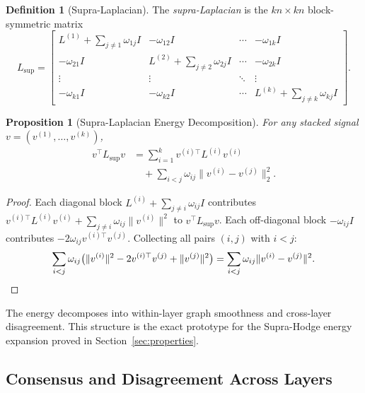 \documentclass[11pt]{article}
\newtheorem{proposition}[theorem]{Proposition}
\theoremstyle{definition}
\newtheorem{definition}[theorem]{Definition}
\theoremstyle{remark}
\newcommand{\Lsup}{L_{\mathrm{sup}}}
\begin{document}
\begin{definition}[Supra-Laplacian]
The \emph{supra-Laplacian} is the $kn\times kn$ block-symmetric matrix
\begin{equation}
  \label{eq:supra}
  \Lsup =
  \begin{bmatrix}
    L^{(1)} + \textstyle\sum_{j\neq 1}\omega_{1j}I & -\omega_{12}I & \cdots & -\omega_{1k}I\\
    -\omega_{21}I & L^{(2)} + \textstyle\sum_{j\neq 2}\omega_{2j}I & \cdots & -\omega_{2k}I\\
    \vdots & \vdots & \ddots & \vdots\\
    -\omega_{k1}I & -\omega_{k2}I & \cdots & L^{(k)} + \textstyle\sum_{j\neq k}\omega_{kj}I
  \end{bmatrix}.
\end{equation}
\end{definition}

\begin{proposition}[Supra-Laplacian Energy Decomposition]
\label{prop:supra_energy}
For any stacked signal $v=(v^{(1)},\allowbreak \dots,\allowbreak v^{(k)})$,
\begingroup
\small
\[
  \begin{aligned}
    v^\top \Lsup v
    &= \sum_{i=1}^k v^{(i)\top} L^{(i)} v^{(i)} \\
    &\quad + \sum_{i<j}\omega_{ij}\|v^{(i)} - v^{(j)}\|_2^2.
  \end{aligned}
\]
\endgroup
\end{proposition}

\begin{proof}
Each diagonal block $L^{(i)}+\sum_{j\neq i}\omega_{ij}I$ contributes
$v^{(i)\top}L^{(i)}v^{(i)} + \sum_{j\neq i}\omega_{ij}\|v^{(i)}\|^2$ to
$v^\top\Lsup v$. Each off-diagonal block $-\omega_{ij}I$ contributes
$-2\omega_{ij}v^{(i)\top}v^{(j)}$. Collecting all pairs $(i,j)$ with $i<j$:
\[
  \sum_{i<j}\omega_{ij}\bigl(\|v^{(i)}\|^2 - 2v^{(i)\top}v^{(j)}
  + \|v^{(j)}\|^2\bigr)
  = \sum_{i<j}\omega_{ij}\|v^{(i)}-v^{(j)}\|^2. \qedhere
\]
\end{proof}

The energy decomposes into within-layer graph smoothness and cross-layer
disagreement. This structure is the exact prototype for the Supra-Hodge energy
expansion proved in Section~\ref{sec:properties}.

\subsection{Consensus and Disagreement Across Layers}
\end{document}
